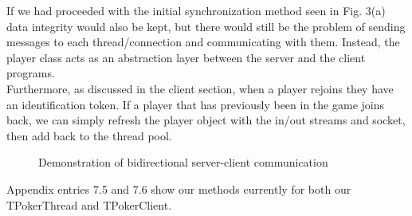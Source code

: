 \documentclass[11pt]{article}
\begin{document}
If we had proceeded with the initial synchronization method seen in Fig. 3(a) data integrity would also be kept, but there would still be the problem of sending messages to each thread/connection and communicating with them. Instead, the player class acts as an abstraction layer between the server and the client programs. \\

Furthermore, as discussed in the client section, when a player rejoins they have an identification token. If a player that has previously been in the game joins back, we can simply refresh the player object with the in/out streams and socket, then add back to the thread pool.


\begin{figure}[h]
	
	\caption{Demonstration of bidirectional server-client communication}
	
\end{figure}




Appendix entries 7.5 and 7.6 show our methods currently for both our TPokerThread and TPokerClient.
\end{document}
